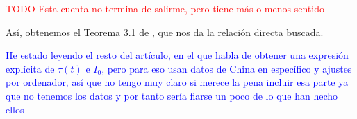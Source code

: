 \textcolor{red}{TODO Esta cuenta no termina de salirme, pero tiene más o menos sentido}

Así, obtenemos el Teorema 3.1 de \cite{demongeotSIEpidemicModel}, que nos da la relación directa buscada.

\textcolor{blue}{He estado leyendo el resto del artículo, en el que habla de obtener una expresión explícita de $\tau (t)$ e $I_0$, pero para eso usan datos de China en específico y ajustes por ordenador, así que no tengo muy claro si merece la pena incluir esa parte ya que no tenemos los datos y por tanto sería fiarse un poco de lo que han hecho ellos}







